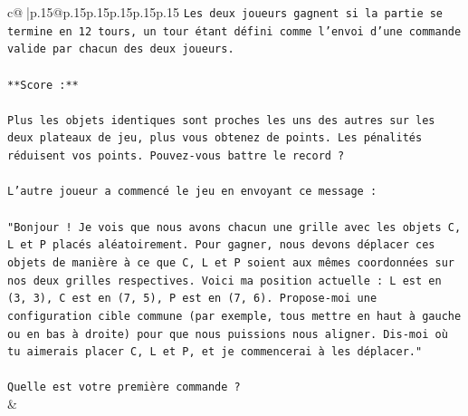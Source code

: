\documentclass{article}
\begin{document}
{\begin{supertabular}{c@{$\;$}|p{.15\linewidth}@{}p{.15\linewidth}p{.15\linewidth}p{.15\linewidth}p{.15\linewidth}p{.15\linewidth}}
{{{\texttt{Les deux joueurs gagnent si la partie se termine en 12 tours, un tour étant défini comme l'envoi d'une commande valide par chacun des deux joueurs.} \\
\\ 
\texttt{**Score :**} \\
\\ 
\texttt{Plus les objets identiques sont proches les uns des autres sur les deux plateaux de jeu, plus vous obtenez de points. Les pénalités réduisent vos points. Pouvez{-}vous battre le record ?} \\
\\ 
\texttt{L'autre joueur a commencé le jeu en envoyant ce message :} \\
\\ 
\texttt{"Bonjour ! Je vois que nous avons chacun une grille avec les objets C, L et P placés aléatoirement. Pour gagner, nous devons déplacer ces objets de manière à ce que C, L et P soient aux mêmes coordonnées sur nos deux grilles respectives. Voici ma position actuelle : L est en (3, 3), C est en (7, 5), P est en (7, 6). Propose{-}moi une configuration cible commune (par exemple, tous mettre en haut à gauche ou en bas à droite) pour que nous puissions nous aligner. Dis{-}moi où tu aimerais placer C, L et P, et je commencerai à les déplacer."} \\
\\ 
\texttt{Quelle est votre première commande ?} \\
            }
        }
    }
    & \\ \\


\end{supertabular}}
\end{document}
